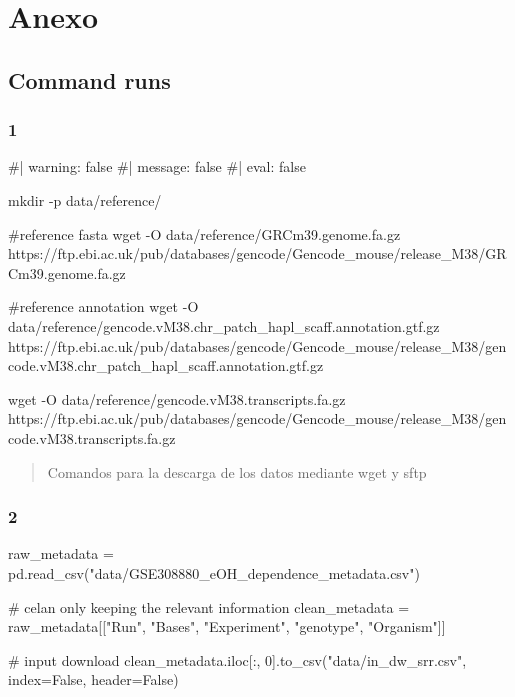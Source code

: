\documentclass[
  10pt,
]{article}
\newenvironment{Shaded}{\begin{snugshade}}{\end{snugshade}}
\newcommand{\CommentTok}[1]{\textcolor[rgb]{0.37,0.37,0.37}{#1}}
\newcommand{\DecValTok}[1]{\textcolor[rgb]{0.68,0.00,0.00}{#1}}
\newcommand{\NormalTok}[1]{\textcolor[rgb]{0.00,0.23,0.31}{#1}}
\newcommand{\OperatorTok}[1]{\textcolor[rgb]{0.37,0.37,0.37}{#1}}
\newcommand{\StringTok}[1]{\textcolor[rgb]{0.13,0.47,0.30}{#1}}
\newcommand{\VariableTok}[1]{\textcolor[rgb]{0.07,0.07,0.07}{#1}}
\begin{document}
\section{Anexo}\label{anexo}

\subsection{Command runs}\label{command-runs}

\subsubsection{1}\label{section}

\begin{Shaded}
\begin{Highlighting}[]
\NormalTok{\#| warning: false}
\NormalTok{\#| message: false}
\NormalTok{\#| eval: false}

\NormalTok{mkdir {-}p data/reference/}

\NormalTok{\#reference fasta}
\NormalTok{wget {-}O data/reference/GRCm39.genome.fa.gz https://ftp.ebi.ac.uk/pub/databases/gencode/Gencode\_mouse/release\_M38/GRCm39.genome.fa.gz }

\NormalTok{\#reference annotation}
\NormalTok{wget {-}O data/reference/gencode.vM38.chr\_patch\_hapl\_scaff.annotation.gtf.gz https://ftp.ebi.ac.uk/pub/databases/gencode/Gencode\_mouse/release\_M38/gencode.vM38.chr\_patch\_hapl\_scaff.annotation.gtf.gz }

\NormalTok{wget {-}O data/reference/gencode.vM38.transcripts.fa.gz https://ftp.ebi.ac.uk/pub/databases/gencode/Gencode\_mouse/release\_M38/gencode.vM38.transcripts.fa.gz}
\end{Highlighting}
\end{Shaded}

\begin{quote}
Comandos para la descarga de los datos mediante wget y sftp
\end{quote}

\subsubsection{2}\label{section-1}

\begin{Shaded}
\begin{Highlighting}[]
\NormalTok{raw\_metadata }\OperatorTok{=}\NormalTok{ pd.read\_csv(}\StringTok{"data/GSE308880\_eOH\_dependence\_metadata.csv"}\NormalTok{)}

\CommentTok{\# celan only keeping the relevant information}
\NormalTok{clean\_metadata }\OperatorTok{=}\NormalTok{ raw\_metadata[[}\StringTok{"Run"}\NormalTok{, }\StringTok{"Bases"}\NormalTok{, }\StringTok{"Experiment"}\NormalTok{, }\StringTok{"genotype"}\NormalTok{, }\StringTok{"Organism"}\NormalTok{]]}

\CommentTok{\# input download}
\NormalTok{clean\_metadata.iloc[:, }\DecValTok{0}\NormalTok{].to\_csv(}\StringTok{"data/in\_dw\_srr.csv"}\NormalTok{, index}\OperatorTok{=}\VariableTok{False}\NormalTok{, header}\OperatorTok{=}\VariableTok{False}\NormalTok{)}
\end{Highlighting}
\end{Shaded}
\end{document}
